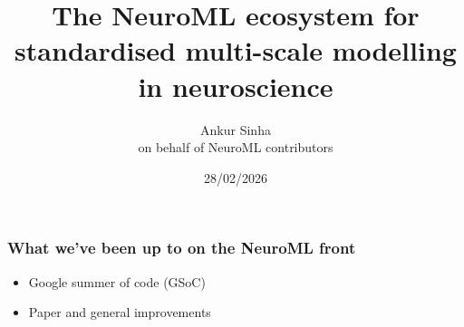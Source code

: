 
\usepackage{color}
\usepackage{tipa}
\usepackage[scale=2]{ccicons}
\usepackage{amssymb}
\usepackage{jneurosci}
\usepackage{subcaption}
\usepackage[T1]{fontenc}
\usepackage[utf8]{inputenc}
% 
\usepackage[sfdefault]{roboto}
\usepackage[normalem]{ulem}
\usepackage{hyperref}
\hypersetup{colorlinks,linkcolor=Green,urlcolor=links}
\usepackage{graphicx}
\usepackage{algorithmic}
\usepackage{textcomp}
\usepackage{wrapfig}
\usepackage{textgreek}
\usepackage{euler}
\usepackage{tabularx}
\usepackage{booktabs}
\usepackage{minted}
\usepackage{csquotes}


\renewcommand{\footnoterule}{}

\title{The NeuroML ecosystem for standardised multi-scale modelling in neuroscience}
\author[Ankur Sinha]{Ankur Sinha\\on behalf of NeuroML contributors}
\date{28/02/2026}




\begin{frame}
  \titlepage{}
\end{frame}
\begin{frame}[c]
  \frametitle{What we've been up to on the NeuroML front}
  \begin{itemize}
    \item Google summer of code (GSoC)
    \item Paper and general improvements
  \end{itemize}
\end{frame}

